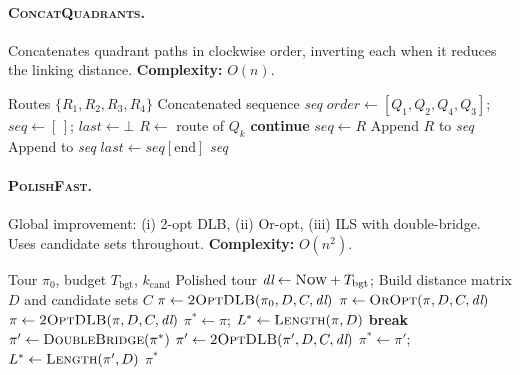\documentclass[runningheads]{llncs}
\begin{document}
\paragraph{\textsc{ConcatQuadrants}.}
Concatenates quadrant paths in clockwise order, inverting each
when it reduces the linking distance.
\textbf{Complexity:} $O(n)$.

\begin{algorithm}
\caption{\textsc{ConcatQuadrants} — Quadrant route assembly}
\label{alg:concat}
\begin{algorithmic}[1]
\Require Routes $\{R_1,R_2,R_3,R_4\}$
\Ensure  Concatenated sequence \textit{seq}
\State $\textit{order}\gets[Q_1,Q_2,Q_4,Q_3]$;\;
       $\textit{seq}\gets[\,]$;\;
       $\textit{last}\gets\bot$
  \State $R\gets$ route of $Q_k$
  \;\textbf{continue}\EndIf
  \; $\textit{seq}\gets R$
  \Else
      \State Append $R$ to \textit{seq}
    \Else
      \State Append  to \textit{seq}
    \EndIf
  \EndIf
  \State $\textit{last}\gets\textit{seq}[\text{end}]$
\EndFor
\State \Return \textit{seq}
\end{algorithmic}
\end{algorithm}

\paragraph{\textsc{PolishFast}.}
Global improvement: (i) 2-opt DLB, (ii) Or-opt, (iii) ILS with
double-bridge. Uses candidate sets throughout.
\textbf{Complexity:} $O(n^2)$.

\begin{algorithm}
\caption{\textsc{PolishFast} — Budget-bounded local-search polishing}
\label{alg:polish}
\begin{algorithmic}[1]
\Require Tour $\pi_0$, budget $T_{\text{bgt}}$, $k_{\text{cand}}$
\Ensure  Polished tour
\State $\textit{dl}\gets\Call{Now}{}+T_{\text{bgt}}$;\;
       Build distance matrix $D$ and candidate sets $C$
\State $\pi\gets\Call{2OptDLB}{\pi_0,D,C,\textit{dl}}$
\State $\pi\gets\Call{OrOpt}{\pi,D,C,\textit{dl}}$
\State $\pi\gets\Call{2OptDLB}{\pi,D,C,\textit{dl}}$
\State $\pi^*\gets\pi$;\; $L^*\gets\Call{Length}{\pi,D}$
  \;\textbf{break}\EndIf
  \State $\pi'\gets\Call{DoubleBridge}{\pi^*}$
  \State $\pi'\gets\Call{2OptDLB}{\pi',D,C,\textit{dl}}$
  \;
    $\pi^*\gets\pi'$;\; $L^*\gets\Call{Length}{\pi',D}$
  \EndIf
\EndFor
\State \Return $\pi^*$
\end{algorithmic}
\end{algorithm}
\end{document}
